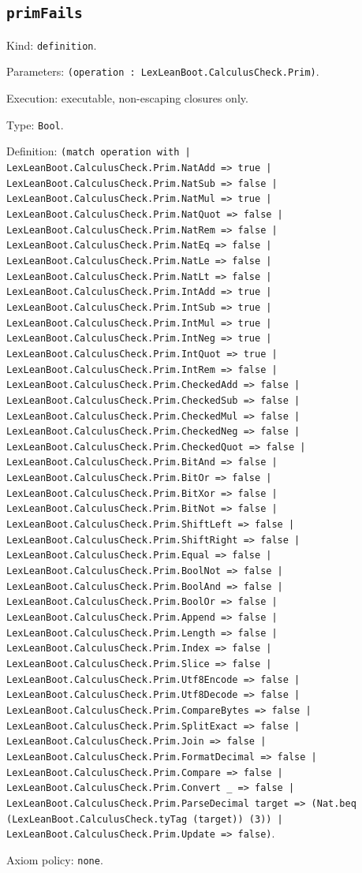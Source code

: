 \documentclass[11pt]{article}
\begin{document}
\subsection*{\texttt{primFails}}
\noindent Kind: \texttt{definition}.\par
\noindent Parameters: \texttt{(operation : LexLeanBoot.CalculusCheck.Prim)}.\par
\noindent Execution: executable, non-escaping closures only.\par
\noindent Type: \texttt{Bool}.\par
\noindent Definition: \texttt{(match operation with | LexLeanBoot.CalculusCheck.Prim.NatAdd => true | LexLeanBoot.CalculusCheck.Prim.NatSub => false | LexLeanBoot.CalculusCheck.Prim.NatMul => true | LexLeanBoot.CalculusCheck.Prim.NatQuot => false | LexLeanBoot.CalculusCheck.Prim.NatRem => false | LexLeanBoot.CalculusCheck.Prim.NatEq => false | LexLeanBoot.CalculusCheck.Prim.NatLe => false | LexLeanBoot.CalculusCheck.Prim.NatLt => false | LexLeanBoot.CalculusCheck.Prim.IntAdd => true | LexLeanBoot.CalculusCheck.Prim.IntSub => true | LexLeanBoot.CalculusCheck.Prim.IntMul => true | LexLeanBoot.CalculusCheck.Prim.IntNeg => true | LexLeanBoot.CalculusCheck.Prim.IntQuot => true | LexLeanBoot.CalculusCheck.Prim.IntRem => false | LexLeanBoot.CalculusCheck.Prim.CheckedAdd => false | LexLeanBoot.CalculusCheck.Prim.CheckedSub => false | LexLeanBoot.CalculusCheck.Prim.CheckedMul => false | LexLeanBoot.CalculusCheck.Prim.CheckedNeg => false | LexLeanBoot.CalculusCheck.Prim.CheckedQuot => false | LexLeanBoot.CalculusCheck.Prim.BitAnd => false | LexLeanBoot.CalculusCheck.Prim.BitOr => false | LexLeanBoot.CalculusCheck.Prim.BitXor => false | LexLeanBoot.CalculusCheck.Prim.BitNot => false | LexLeanBoot.CalculusCheck.Prim.ShiftLeft => false | LexLeanBoot.CalculusCheck.Prim.ShiftRight => false | LexLeanBoot.CalculusCheck.Prim.Equal => false | LexLeanBoot.CalculusCheck.Prim.BoolNot => false | LexLeanBoot.CalculusCheck.Prim.BoolAnd => false | LexLeanBoot.CalculusCheck.Prim.BoolOr => false | LexLeanBoot.CalculusCheck.Prim.Append => false | LexLeanBoot.CalculusCheck.Prim.Length => false | LexLeanBoot.CalculusCheck.Prim.Index => false | LexLeanBoot.CalculusCheck.Prim.Slice => false | LexLeanBoot.CalculusCheck.Prim.Utf8Encode => false | LexLeanBoot.CalculusCheck.Prim.Utf8Decode => false | LexLeanBoot.CalculusCheck.Prim.CompareBytes => false | LexLeanBoot.CalculusCheck.Prim.SplitExact => false | LexLeanBoot.CalculusCheck.Prim.Join => false | LexLeanBoot.CalculusCheck.Prim.FormatDecimal => false | LexLeanBoot.CalculusCheck.Prim.Compare => false | LexLeanBoot.CalculusCheck.Prim.Convert \_ => false | LexLeanBoot.CalculusCheck.Prim.ParseDecimal target => (Nat.beq (LexLeanBoot.CalculusCheck.tyTag (target)) (3)) | LexLeanBoot.CalculusCheck.Prim.Update => false)}.\par
\noindent Axiom policy: \texttt{none}.\par
\end{document}
